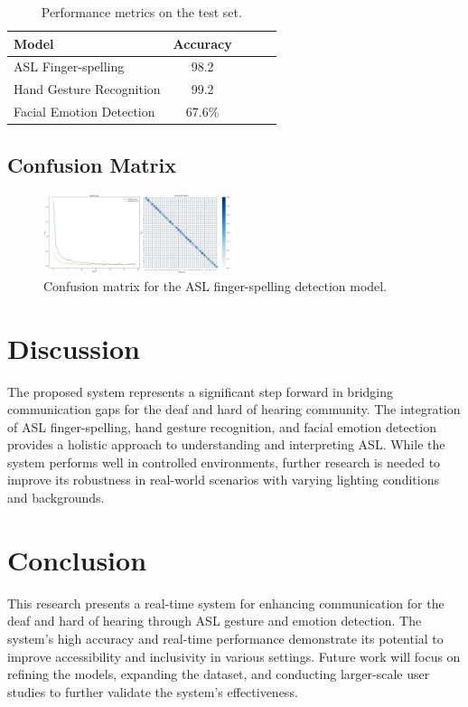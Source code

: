 \documentclass{article}
\begin{document}
\begin{table}[h]
    \centering
    \caption{Performance metrics on the test set.}
    \label{tab:performance-metrics}
    \begin{tabular}{lcccc}
		\hline %
        Model & Accuracy \\
        \hline
        ASL Finger-spelling & 98.2 \\
        Hand Gesture Recognition & 99.2 \\
        Facial Emotion Detection & 67.6\%  \\
        \hline
    \end{tabular}
\end{table}

\subsection{Confusion Matrix}
\begin{figure}[h]
	\centering
	\includegraphics[width=0.5\textwidth]{figures/confusion_1.png} %
	\caption{Confusion matrix for the ASL finger-spelling detection model.}
	\label{fig:confusion-matrix-fingerspelling} %
\end{figure}

\section{Discussion}
The proposed system represents a significant step forward in bridging communication gaps for the deaf and hard of hearing community. The integration of ASL finger-spelling, hand gesture recognition, and facial emotion detection provides a holistic approach to understanding and interpreting ASL. While the system performs well in controlled environments, further research is needed to improve its robustness in real-world scenarios with varying lighting conditions and backgrounds.

\section{Conclusion}
This research presents a real-time system for enhancing communication for the deaf and hard of hearing through ASL gesture and emotion detection. The system's high accuracy and real-time performance demonstrate its potential to improve accessibility and inclusivity in various settings. Future work will focus on refining the models, expanding the dataset, and conducting larger-scale user studies to further validate the system's effectiveness.

\printbibliography
\end{document}
